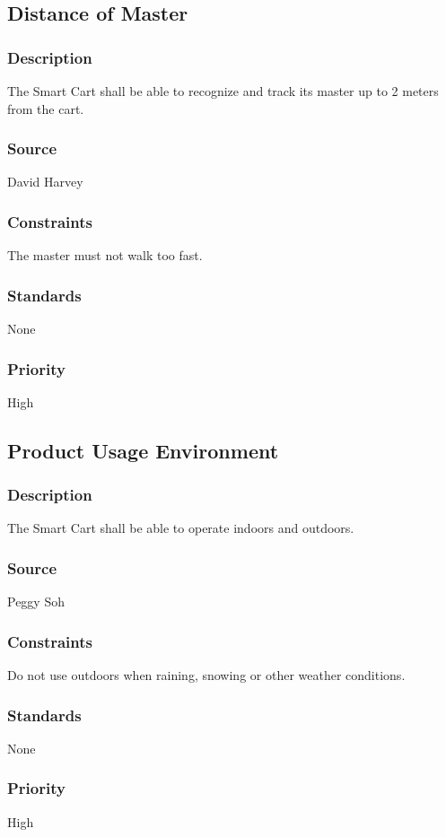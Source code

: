\subsection{Distance of Master}
\subsubsection{Description}
The Smart Cart shall be able to recognize and track its master up to 2 meters from the cart. 
\subsubsection{Source}
David Harvey
\subsubsection{Constraints}
The master must not walk too fast.
\subsubsection{Standards}
None
\subsubsection{Priority}
High

\subsection{Product Usage Environment}
\subsubsection{Description}
The Smart Cart shall be able to operate indoors and outdoors. 
\subsubsection{Source}
Peggy Soh
\subsubsection{Constraints}
Do not use outdoors when raining, snowing or other weather conditions.
\subsubsection{Standards}
None
\subsubsection{Priority}
High
